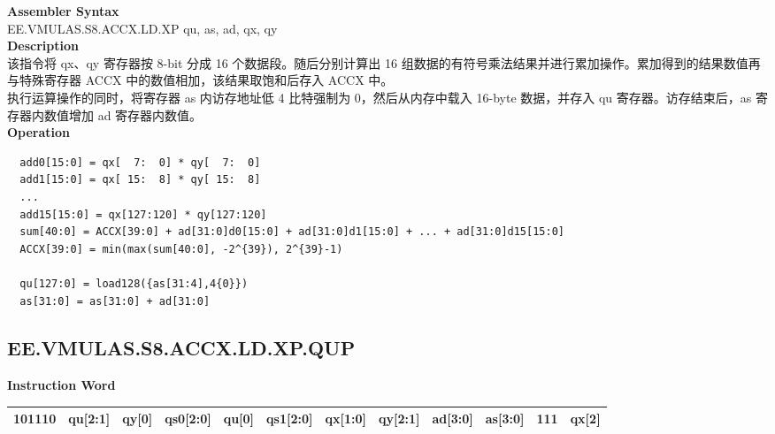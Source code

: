 \textbf{Assembler Syntax} \\
EE.VMULAS.S8.ACCX.LD.XP qu, as, ad, qx, qy \\
\textbf{Description} \\
该指令将 qx、qy 寄存器按 8-bit 分成 16 个数据段。随后分别计算出 16 组数据的有符号乘法结果并进行累加操作。累加得到的结果数值再与特殊寄存器 ACCX 中的数值相加，该结果取饱和后存入 ACCX 中。\\
执行运算操作的同时，将寄存器 as 内访存地址低 4 比特强制为 0，然后从内存中载入 16-byte 数据，并存入 qu 寄存器。访存结束后，as 寄存器内数值增加 ad 寄存器内数值。\\
\textbf{Operation}
\begin{lstlisting}
  add0[15:0] = qx[  7:  0] * qy[  7:  0]
  add1[15:0] = qx[ 15:  8] * qy[ 15:  8]
  ...
  add15[15:0] = qx[127:120] * qy[127:120]
  sum[40:0] = ACCX[39:0] + ad[31:0]d0[15:0] + ad[31:0]d1[15:0] + ... + ad[31:0]d15[15:0]
  ACCX[39:0] = min(max(sum[40:0], -2^{39}), 2^{39}-1)

  qu[127:0] = load128({as[31:4],4{0}})
  as[31:0] = as[31:0] + ad[31:0]
\end{lstlisting}

\clearpage
\subsection{EE.VMULAS.S8.ACCX.LD.XP.QUP}\label{instruction:EEVMULASS8ACCXLDXPQUP}
\setlength\tabcolsep{6pt}
\textbf{Instruction Word} \\
\begin{tabular}{|c|c|c|c|c|c|c|c|c|c|c|c|}
	\hline
	101110 & qu[2:1] & qy[0] & qs0[2:0] & qu[0] & qs1[2:0] & qx[1:0] & qy[2:1] & ad[3:0] & as[3:0] & 111 & qx[2] \\
	\hline
\end{tabular}

